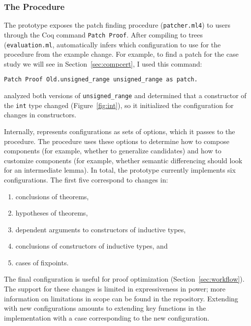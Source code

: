 \subsubsection{The Procedure}
\label{sec:pumpkin-impl-procedure}

The \sysname prototype exposes the patch finding procedure (\lstinline{patcher.ml4}) to users through the Coq command \lstinline{Patch Proof}. 
After compiling to trees (\lstinline{evaluation.ml},
\sysname automatically infers which configuration to use for the procedure from the example change. %
For example, to find a patch for the case study we will see in Section~\ref{sec:compcert}, I
used this command: %

\begin{lstlisting}[language=ml4]
  Patch Proof Old.unsigned_range unsigned_range as patch.
\end{lstlisting}
\sysname analyzed both versions of \lstinline{unsigned_range} and determined 
that a constructor of the \lstinline{int} type changed (Figure~\ref{fig:int}),
so it initialized the configuration for changes in constructors.

Internally, \sysname represents configurations as sets of options,
which it passes to the procedure. The procedure uses these options to determine
how to compose components (for example, whether to generalize candidates) 
and how to customize components (for example, whether semantic differencing should look for an intermediate lemma).
In total, the \sysname prototype currently implements six configurations.
The first five correspond to changes in:

\begin{enumerate}
\item conclusions of theorems,
\item hypotheses of theorems,
\item dependent arguments to constructors of inductive types, 
\item conclusions of constructors of inductive types, and
\item cases of fixpoints.
\end{enumerate}
The final configuration is useful for proof optimization (Section~\ref{sec:workflow}).
The support for these changes is limited in expressiveness in power;
more information on limitations in scope can be found in the repository. %
Extending \sysname with new configurations amounts to extending key functions in the implementation
with a case corresponding to the new configuration.

